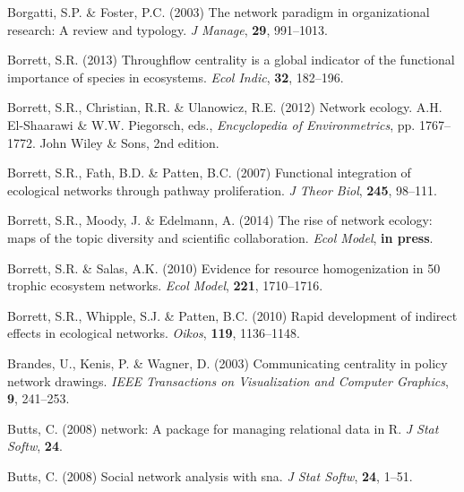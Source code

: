 \documentclass[11pt]{article}
\begin{document}
\begin{thebibliography}{75}
Borgatti, S.P. \& Foster, P.C. (2003) The network paradigm in organizational
  research: A review and typology.
\newblock \emph{J Manage}, \textbf{29}, 991--1013.

Borrett, S.R. (2013) Throughflow centrality is a global indicator of the
  functional importance of species in ecosystems.
\newblock \emph{Ecol Indic}, \textbf{32}, 182--196.

Borrett, S.R., Christian, R.R. \& Ulanowicz, R.E. (2012) Network ecology.
\newblock A.H. El-Shaarawi \& W.W. Piegorsch, eds., \emph{Encyclopedia of
  Environmetrics}, pp. 1767--1772. John Wiley \& Sons, 2nd edition.

Borrett, S.R., Fath, B.D. \& Patten, B.C. (2007) Functional integration of
  ecological networks through pathway proliferation.
\newblock \emph{J Theor Biol}, \textbf{245}, 98--111.

Borrett, S.R., Moody, J. \& Edelmann, A. (2014) The rise of network ecology:
  maps of the topic diversity and scientific collaboration.
\newblock \emph{Ecol Model}, \textbf{in press}.

Borrett, S.R. \& Salas, A.K. (2010) Evidence for resource homogenization in 50
  trophic ecosystem networks.
\newblock \emph{Ecol Model}, \textbf{221}, 1710--1716.

Borrett, S.R., Whipple, S.J. \& Patten, B.C. (2010) Rapid development of
  indirect effects in ecological networks.
\newblock \emph{Oikos}, \textbf{119}, 1136--1148.

Brandes, U., Kenis, P. \& Wagner, D. (2003) Communicating centrality in policy
  network drawings.
\newblock \emph{IEEE Transactions on Visualization and Computer Graphics},
  \textbf{9}, 241--253.

Butts, C. (2008{}) network: A package for managing relational data
  in {R}.
\newblock \emph{J Stat Softw}, \textbf{24}.

Butts, C. (2008{}) Social network analysis with sna.
\newblock \emph{J Stat Softw}, \textbf{24}, 1--51.


\end{thebibliography}
\end{document}
